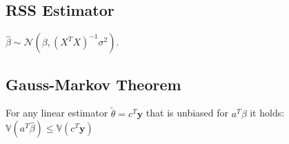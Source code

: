 \subsection*{RSS Estimator}
$\hat{\beta} \sim \mathcal{N}(\beta,(X^TX)^{-1}\sigma^2)$.

\subsection*{Gauss-Markov Theorem}
For any linear estimator $\widetilde{\theta}=c^T\mathbf{y}$ that is unbiased for $a^T\beta$ it holds: $\mathbb{V}(a^T\hat{\beta}) \leq \mathbb{V}(c^T\mathbf{y})$\\





